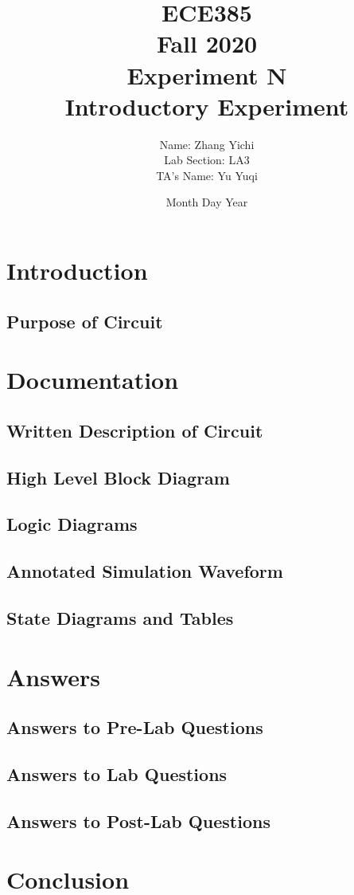 \documentclass[12pt]{article}
\title{
    \textbf{\Huge ECE385} \\
    \huge Fall 2020 \\
    \huge Experiment N \\[120pt]
    \textbf{\Huge Introductory Experiment} \\[120pt]
    }
\author{
    \large Name: Zhang Yichi \\
    \large Lab Section: LA3 \\
    \large TA's Name: Yu Yuqi
    }
\date{Month Day Year}
\begin{document}
\maketitle
\newpage

\section{Introduction}
\subsection{\textbf{Purpose of Circuit}}


\section{Documentation}
\subsection{\textbf{Written Description of Circuit}}

\subsection{\textbf{High Level Block Diagram}}

\subsection{\textbf{Logic Diagrams}}

\subsection{\textbf{Annotated Simulation Waveform}}

\subsection{\textbf{State Diagrams and Tables}}

\section{Answers}
\subsection{\textbf{Answers to Pre-Lab Questions}}


\subsection{\textbf{Answers to Lab Questions}}


\subsection{\textbf{Answers to Post-Lab Questions}}


\section{Conclusion}


\newpage


\end{document}
